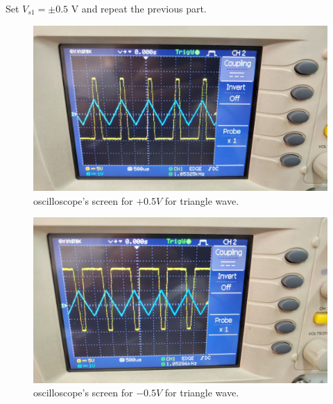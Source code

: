 \documentclass[11pt]{article}
\newcommand{\PicScale}{0.2}
\begin{document}
\begin{question}
\begin{subquestion}{Set $V_{s1}=\pm 0.5$ V and repeat the previous part.}
{\begin{figure}[H]
                \centering
                \includegraphics[scale=\PicScale,angle=0]{Fig/51.jpeg}
                \caption{oscilloscope's screen for $+0.5V$ for triangle wave.}
            \end{figure}
            \begin{figure}[H]
                \centering
                \includegraphics[scale=\PicScale,angle=0]{Fig/52.jpeg}
                \caption{oscilloscope's screen for $-0.5V$ for triangle wave.}
            \end{figure}
        }
    \end{subquestion}


\end{question}
\end{document}
